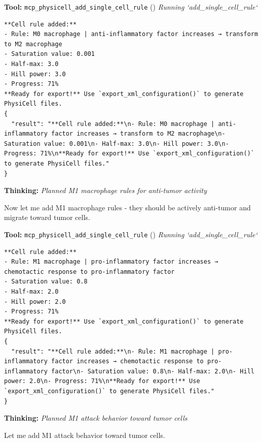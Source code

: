 \documentclass[11pt,a4paper]{article}
\begin{document}
\begin{toolokbox}
\textbf{Tool:} \texttt{mcp\_physicell\_add\_single\_cell\_rule} (\checkmark)
\textit{Running `add\_single\_cell\_rule`}
\begin{lstlisting}
**Cell rule added:**
- Rule: M0 macrophage | anti-inflammatory factor increases → transform to M2 macrophage
- Saturation value: 0.001
- Half-max: 3.0
- Hill power: 3.0
- Progress: 71%
**Ready for export!** Use `export_xml_configuration()` to generate PhysiCell files.
{
  "result": "**Cell rule added:**\n- Rule: M0 macrophage | anti-inflammatory factor increases → transform to M2 macrophage\n- Saturation value: 0.001\n- Half-max: 3.0\n- Hill power: 3.0\n- Progress: 71%\n**Ready for export!** Use `export_xml_configuration()` to generate PhysiCell files."
}
\end{lstlisting}
\end{toolokbox}
\begin{thinkbox}
\textbf{Thinking:} \textit{Planned M1 macrophage rules for anti-tumor activity}

Now let me add M1 macrophage rules - they should be actively anti-tumor and migrate toward tumor cells.

\end{thinkbox}
\begin{toolokbox}
\textbf{Tool:} \texttt{mcp\_physicell\_add\_single\_cell\_rule} (\checkmark)
\textit{Running `add\_single\_cell\_rule`}
\begin{lstlisting}
**Cell rule added:**
- Rule: M1 macrophage | pro-inflammatory factor increases → chemotactic response to pro-inflammatory factor
- Saturation value: 0.8
- Half-max: 2.0
- Hill power: 2.0
- Progress: 71%
**Ready for export!** Use `export_xml_configuration()` to generate PhysiCell files.
{
  "result": "**Cell rule added:**\n- Rule: M1 macrophage | pro-inflammatory factor increases → chemotactic response to pro-inflammatory factor\n- Saturation value: 0.8\n- Half-max: 2.0\n- Hill power: 2.0\n- Progress: 71%\n**Ready for export!** Use `export_xml_configuration()` to generate PhysiCell files."
}
\end{lstlisting}
\end{toolokbox}
\begin{thinkbox}
\textbf{Thinking:} \textit{Planned M1 attack behavior toward tumor cells}

Let me add M1 attack behavior toward tumor cells.

\end{thinkbox}
\end{document}
